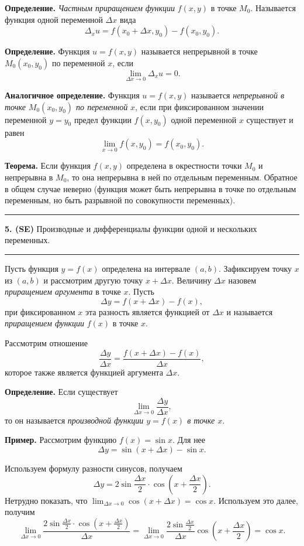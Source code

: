 \documentclass[12pt]{article}
\begin{document}
\textbf{Определение.} \textit{Частным приращением функции} $f(x,y)$ в точке $M_0$. Называется функция одной переменной $\Delta x$ вида
$$
	\Delta_x u = f(x_0 + \Delta x, y_0) - f(x_0, y_0).
$$


\textbf{Определение.} Функция $u = f(x,y)$ называется непрерывной в точке $M_0(x_0,y_0)$ по переменной $x$, если 
$$
	\lim_{\Delta x \rightarrow 0} \Delta_x u = 0.
$$


\textbf{Аналогичное определение.} Функция $u = f(x,y)$ называется \textit{непрерывной в точке $M_0(x_0,y_0)$ по переменной} $x$, если при фиксированном значении переменной $y = y_0$ предел функции $f(x,y_0)$ одной переменной $x$ существует и равен
$$
\lim_{x\rightarrow 0}f(x,y_0) = f(x_0,y_0).
$$

\textbf{Теорема.} Если функция $f(x,y)$ определена в окрестности точки $M_0$ и непрерывна в $M_0$, то она непрерывна в ней по отдельным переменным. Обратное в общем случае неверно (функция может быть непрерывна в точке по отдельным переменным, но быть разрывной по совокупности переменных).

\noindent\rule{\textwidth}{1pt}
\textbf{5. (SE)} Производные и дифференциалы функции одной и нескольких переменных.\\
\noindent\rule{\textwidth}{1pt}


Пусть функция $y = f(x)$ определена на интервале $(a,b)$. Зафиксируем точку $x$ из $(a,b)$ и рассмотрим другую точку $x + \Delta x$. Величину $\Delta x$ назовем \textit{приращением аргумента} в точке $x$. Пусть
$$
	\Delta y = f(x + \Delta x) - f(x),
$$
при фиксированном $x$ эта разность является функцией от $\Delta x$ и называется \textit{приращением функции} $f(x)$ в точке $x$.

Рассмотрим отношение
$$
\frac{\Delta y}{\Delta x} = \frac{f(x + \Delta x) - f(x)}{\Delta x},
$$
которое также является функцией аргумента $\Delta x$. 

\textbf{Определение.} Если существует 
$$
	\lim_{\Delta x \rightarrow 0}   \frac{\Delta y}{\Delta x}, 
$$
то он называется \textit{производной функции $y = f(x)$ в точке $x$}.

\textbf{Пример.} Рассмотрим функцию $f(x) = \sin{x}$. Для нее 
$$
\Delta y = \sin{(x + \Delta x)} - \sin{x}.
$$

Используем формулу разности синусов, получаем
$$
	\Delta y = 2 \sin \frac{\Delta x}{2} \cdot \cos(x + \frac{\Delta x} {2}).
$$
Нетрудно показать, что $\lim_{\Delta x \rightarrow 0} \cos(x + \Delta x) = \cos x $. Используем это далее, получим
$$
	\lim_{\Delta x \rightarrow 0} \frac{ 2 \sin \frac{\Delta x}{2} \cdot \cos(x + \frac{\Delta x} {2})}{\Delta x} = 
	\lim_{\Delta x \rightarrow 0} \frac{ 2 \sin \frac{\Delta x}{2}}{\Delta x} \cos(x + \frac{\Delta x}{2}) = \cos x.
$$
\end{document}
